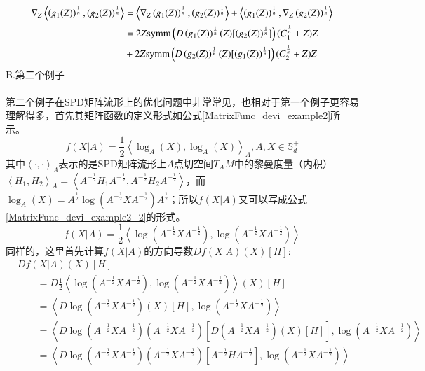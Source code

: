 \begin{equation}
\label{devi_power_metric_final}
\begin{split}
\nabla_{Z}\left<\left(g_{1}(Z)\right)^{\frac{1}{n}},\left(g_{2}(Z)\right)^{\frac{1}{n}}\right>&=\left<\nabla_{Z}\left(g_{1}(Z)\right)^{\frac{1}{n}},\left(g_{2}(Z)\right)^{\frac{1}{n}}\right>+\left<\left(g_{1}(Z)\right)^{\frac{1}{n}},\nabla_{Z}\left(g_{2}(Z)\right)^{\frac{1}{n}}\right>\\
&=2Z{\rm symm}\left(D\left(g_{1}(Z)\right)^{\frac{1}{n}}(Z)[\left(g_{2}(Z)\right)^{\frac{1}{n}}]\right)(C_{1}^{\frac{1}{n}}+Z)Z\\
&+2Z{\rm symm}\left(D\left(g_{2}(Z)\right)^{\frac{1}{n}}(Z)[\left(g_{1}(Z)\right)^{\frac{1}{n}}]\right)(C_{2}^{\frac{1}{n}}+Z)Z
\end{split}
\end{equation}
{\heiti B.第二个例子}\\\\
第二个例子在SPD矩阵流形上的优化问题中非常常见，也相对于第一个例子更容易理解得多，首先其矩阵函数的定义形式如公式\ref{MatrixFunc_devi_example2}所示。
\begin{equation}
\label{MatrixFunc_devi_example2}
f(X|A)=\frac{1}{2}\left<\log_{A}(X),\log_{A}(X)\right>_A,A,X\in \mathbb{S}_{d}^{+}
\end{equation}
其中$\left<\cdot,\cdot\right>_A$表示的是SPD矩阵流形上$A$点切空间$T_{A}M$中的黎曼度量（内积）$\left<H_1,H_2\right>_A=\left<A^{-\frac{1}{2}}H_1A^{-\frac{1}{2}},A^{-\frac{1}{2}}H_2A^{-\frac{1}{2}}\right>$，而$\log_A(X)=A^{\frac{1}{2}}\log(A^{-\frac{1}{2}}XA^{-\frac{1}{2}})A^{\frac{1}{2}}$；所以$f(X|A)$又可以写成公式\ref{MatrixFunc_devi_example2_2}的形式。
\begin{equation}
\label{MatrixFunc_devi_example2_2}
f(X|A)=\frac{1}{2}\left<\log(A^{-\frac{1}{2}}XA^{-\frac{1}{2}}),\log(A^{-\frac{1}{2}}XA^{-\frac{1}{2}})\right>
\end{equation}
同样的，这里首先计算$f(X|A)$的方向导数$Df(X|A)(X)[H]$:
\begin{equation}
\label{AIM_CrossTerm_direction_devi}
\begin{split}
&Df(X|A)(X)[H]\\
&~~~~~~~~~=D\frac{1}{2}\left<\log(A^{-\frac{1}{2}}XA^{-\frac{1}{2}}),\log(A^{-\frac{1}{2}}XA^{-\frac{1}{2}})\right>(X)[H]\\
&~~~~~~~~~=\left<D\log(A^{-\frac{1}{2}}XA^{-\frac{1}{2}})(X)[H],\log(A^{-\frac{1}{2}}XA^{-\frac{1}{2}})\right>\\
&~~~~~~~~~=\left<D\log(A^{-\frac{1}{2}}XA^{-\frac{1}{2}})(A^{-\frac{1}{2}}XA^{-\frac{1}{2}})[D(A^{-\frac{1}{2}}XA^{-\frac{1}{2}})(X)[H]],\log(A^{-\frac{1}{2}}XA^{-\frac{1}{2}})\right>\\
&~~~~~~~~~=\left<D\log(A^{-\frac{1}{2}}XA^{-\frac{1}{2}})(A^{-\frac{1}{2}}XA^{-\frac{1}{2}})[A^{-\frac{1}{2}}HA^{-\frac{1}{2}}],\log(A^{-\frac{1}{2}}XA^{-\frac{1}{2}})\right>\\
\end{split}
\end{equation}
